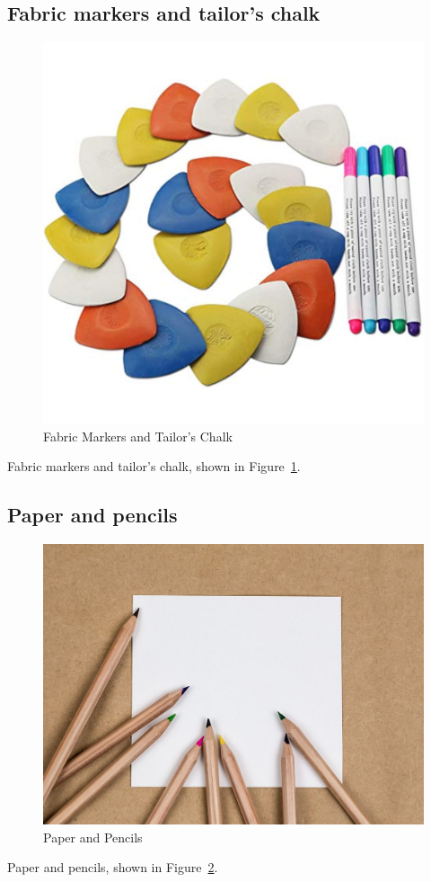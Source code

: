 \documentclass[letterpaper,twoside,12pt]{article}
\begin{document}
\subsection{Fabric markers and tailor's chalk}
\begin{figure}[hbpt]\begin{centering}%
\includegraphics[width=5in]{Fabricmarkerstailorschalk.jpg}
\caption{Fabric Markers and Tailor's Chalk}
\label{fig:fabricmarkerstailorschalk}
\end{centering}\end{figure}
Fabric markers and tailor's chalk, shown in Figure~\ref{fig:fabricmarkerstailorschalk}.
\subsection{Paper and pencils}
\begin{figure}[hbpt]\begin{centering}%
\includegraphics[width=5in]{Paperandpencils.jpg}
\caption{Paper and Pencils}
\label{fig:paperandpencils}
\end{centering}\end{figure}
Paper and pencils, shown in Figure~\ref{fig:paperandpencils}.
\clearpage
\end{document}
